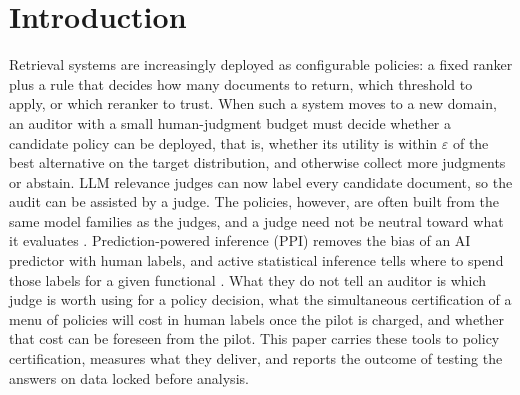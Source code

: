 \documentclass{article}
\newcommand{\eps}{\varepsilon}
\begin{document}
\section{Introduction}
Retrieval systems are increasingly deployed as configurable policies: a fixed ranker plus a rule that decides how many documents to return, which threshold to apply, or which reranker to trust. When such a system moves to a new domain, an auditor with a small human-judgment budget must decide whether a candidate policy can be deployed, that is, whether its utility is within $\eps$ of the best alternative on the target distribution, and otherwise collect more judgments or abstain. LLM relevance judges can now label every candidate document, so the audit can be assisted by a judge. The policies, however, are often built from the same model families as the judges, and a judge need not be neutral toward what it evaluates \citep{balog2025rankers}. Prediction-powered inference (PPI) removes the bias of an AI predictor with human labels, and active statistical inference tells where to spend those labels for a given functional \citep{angelopoulos2023ppi,angelopoulos2023ppipp,zrnic2024active}. What they do not tell an auditor is which judge is worth using for a policy decision, what the simultaneous certification of a menu of policies will cost in human labels once the pilot is charged, and whether that cost can be foreseen from the pilot. This paper carries these tools to policy certification, measures what they deliver, and reports the outcome of testing the answers on data locked before analysis.
\end{document}
